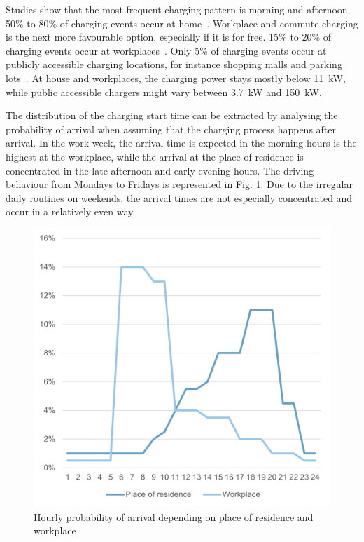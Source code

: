 Studies show that the most frequent charging pattern is morning and afternoon. 50\% to 80\% of charging events occur at home~\cite{lee_exploring_2020}. Workplace and commute charging is the next more favourable option, especially if it is for free. 15\% to 20\% of charging events occur at workplaces~\cite{lee_exploring_2020}. Only 5\% of charging events occur at publicly accessible charging locations, for instance shopping malls and parking lots~\cite{lee_exploring_2020}. At house and workplaces, the charging power stays mostly below 11~kW, while public accessible chargers might vary between 3.7~kW and 150~kW. 

The distribution of the charging start time can be extracted by analysing the probability of arrival when assuming that the charging process happens after arrival. In the work week, the arrival time is expected in the morning hours is the highest at the workplace, while the arrival at the place of residence is concentrated in the late afternoon and early evening hours. The driving behaviour from Mondays to Fridays is represented in Fig. \ref{fig:drivingpattern}. Due to the irregular daily routines on weekends, the arrival times are not especially concentrated and occur in a relatively even way. 

\begin{figure}[ht]
    \centering
    \includegraphics[scale=0.8]{thesis-latex/img/charging probability.png}
    \caption{Hourly probability of arrival depending on place of residence and workplace~\cite{VDEFNN_2021}}
    \label{fig:drivingpattern}
\end{figure}

